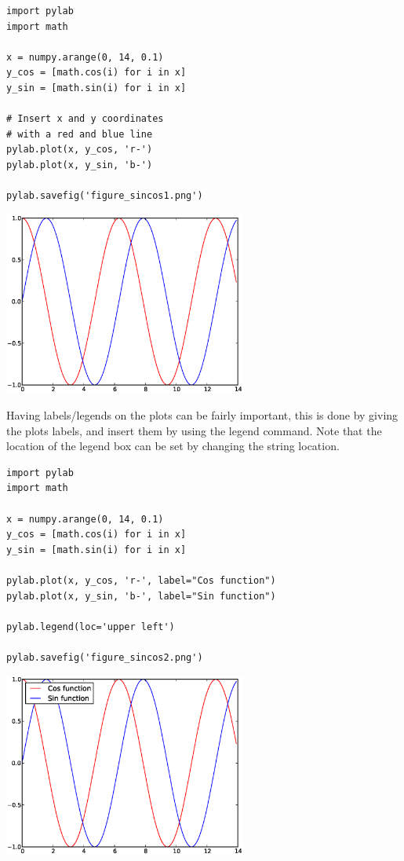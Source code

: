 \documentclass{article}
\begin{document}
\begin{multicols}{2}

\begin{lstlisting}
import pylab
import math

x = numpy.arange(0, 14, 0.1)
y_cos = [math.cos(i) for i in x]
y_sin = [math.sin(i) for i in x]

# Insert x and y coordinates
# with a red and blue line
pylab.plot(x, y_cos, 'r-')
pylab.plot(x, y_sin, 'b-')

pylab.savefig('figure_sincos1.png')

\end{lstlisting}
\columnbreak
\includegraphics[width=0.6\textwidth]{py/figure_sincos1.eps}
\end{multicols}

Having labels/legends on the plots can be fairly important, this
is done by giving the plots labels, and insert them by using the legend
command.
Note that the location of the legend box can be set by changing the string location.


\begin{multicols}{2}

\begin{lstlisting}
import pylab
import math

x = numpy.arange(0, 14, 0.1)
y_cos = [math.cos(i) for i in x]
y_sin = [math.sin(i) for i in x]

pylab.plot(x, y_cos, 'r-', label="Cos function")
pylab.plot(x, y_sin, 'b-', label="Sin function")

pylab.legend(loc='upper left')

pylab.savefig('figure_sincos2.png')

\end{lstlisting}
\columnbreak
\includegraphics[width=0.6\textwidth]{py/figure_sincos2.eps}
\end{multicols}
\end{document}
